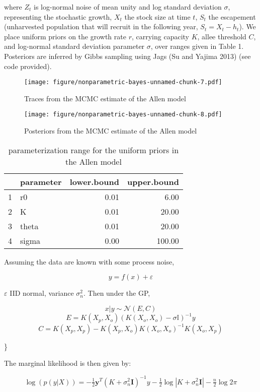 \documentclass[author-year, review]{elsarticle} %
\makeatletter
\def\maxwidth{\ifdim\Gin@nat@width>\linewidth\linewidth
\else\Gin@nat@width\fi}
\let\Oldincludegraphics\includegraphics
\renewcommand{\includegraphics}[1]{\Oldincludegraphics[width=\maxwidth]{#1}}
\makeatother
\begin{document}
where $Z_t$ is log-normal noise of mean unity and log standard deviation
$\sigma$, representing the stochastic growth, $X_t$ the stock size at
time $t$, $S_t$ the escapement (unharvested population that will recruit
in the following year, $S_t = X_t - h_t$). We place uniform priors on
the growth rate $r$, carrying capacity $K$, allee threshold $C$, and
log-normal standard deviation parameter $\sigma$, over ranges given in
Table 1. Posteriors are inferred by Gibbs sampling using Jags (Su and
Yajima 2013) (see code provided).

\begin{figure}[htbp]
\centering
\texttt{[image: figure/nonparametric-bayes-unnamed-chunk-7.pdf]}
\caption{Traces from the MCMC estimate of the Allen model}
\end{figure}

\begin{figure}[htbp]
\centering
\texttt{[image: figure/nonparametric-bayes-unnamed-chunk-8.pdf]}
\caption{Posteriors from the MCMC estimate of the Allen model}
\end{figure}

\begin{table}[ht]
\begin{center}
\begin{tabular}{rlrr}
  \hline
 & parameter & lower.bound & upper.bound \\ 
  \hline
1 & r0 & 0.01 & 6.00 \\ 
  2 & K & 0.01 & 20.00 \\ 
  3 & theta & 0.01 & 20.00 \\ 
  4 & sigma & 0.00 & 100.00 \\ 
   \hline
\end{tabular}
\caption{parameterization range for the uniform priors in the Allen model}
\end{center}
\end{table}

Assuming the data are known with some process noise,

\[y = f(x) + \varepsilon\]

$\varepsilon$ IID normal, variance $\sigma_n^2$. Then under the GP,

\[x|y \sim \mathcal{N}(E,C)\]
\[E = K(X_p, X_o) \left(K(X_o,X_o) - \sigma \mathbb{I} \right)  ^{-1} y\]
\[C = K(X_p, X_p) - K(X_p, X_o) K(X_o,X_o)^{-1} K(X_o, X_p)\]

\}

The marginal likelihood is then given by:

\[\log(p(y | X)) = -\tfrac{1}{2} \mathbf{y}^T (K + \sigma_n^2 \mathbf{I})^{-1} y  - \tfrac{1}{2} \log\left| K + \sigma_n^2 \mathbf{I} \right| - \tfrac{n}{2}\log 2 \pi\]
\end{document}
